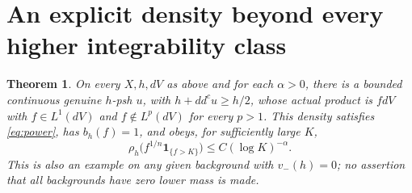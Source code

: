 \documentclass[11pt]{article}
\newcommand{\ddc}{dd^c}
\newtheorem{theorem}{Theorem}
\theoremstyle{remark}\newtheorem{remark}[theorem]{Remark}
\begin{document}
\section{An explicit density beyond every higher integrability class}
\begin{theorem}\label{th:example}
On every $X,h,dV$ as above and for each $\alpha>0$, there is a bounded
continuous genuine $h$-psh $u$, with $h+\ddc u\geq h/2$, whose actual
product is $fdV$ with $f\in L^1(dV)$ and $f\notin L^p(dV)$ for
every $p>1$. This density satisfies \eqref{eq:power}, has
$b_h(f)=1$, and obeys, for sufficiently large $K$,
\[
 \rho_h\bigl(f^{1/n}\mathbf1_{\{f>K\}}\bigr)
          \leq C(\log K)^{-\alpha}.
\]
This is also an example on any given background with $v_-(h)=0$;
no assertion that all backgrounds have zero lower mass is made.
\end{theorem}
\end{document}
